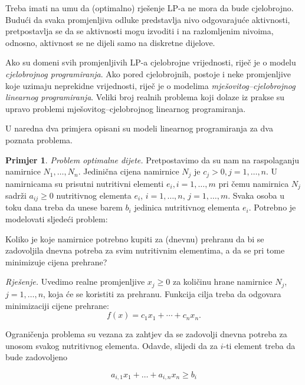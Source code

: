 \documentclass[a4paper, utf8, 11pt, colorlinks]{book}
\theoremstyle{definition}
\newtheorem{primjer}{Primjer}[chapter]
\begin{document}
Treba imati na umu da (optimalno) rješenje LP-a ne mora da bude cjelobrojno. Budući da svaka promjenljiva odluke predstavlja nivo odgovarajuće aktivnosti, pretpostavlja se da se aktivnosti mogu izvoditi i na razlomljenim nivoima, odnosno, aktivnost  se ne dijeli samo na diskretne dijelove. 

Ako su domeni svih promjenljivih LP-a cjelobrojne vrijednosti, riječ je o modelu \emph{cjelobrojnog programiranja}. Ako pored cjelobrojnih, postoje i neke promjenljive koje uzimaju neprekidne vrijednosti, riječ je o modelima \emph{mješovitog--cjelobrojnog linearnog programiranja}. Veliki broj realnih problema koji dolaze iz prakse su upravo problemi mješovitog--cjelobrojnog linearnog programiranja.
 


U naredna dva primjera opisani su modeli linearnog programiranja za dva poznata problema. 

\begin{primjer}
\emph{Problem optimalne dijete.} Pretpostavimo da su nam na raspolaganju namirnice $N_1, \ldots, N_n$. Jedinična cijena namirnice $N_j$ je $c_j>0, j = 1, \ldots, n$. U namirnicama su prisutni nutritivni elementi $e_i,i=1,\ldots,m$ pri čemu
namirnica $N_j$ sadrži $a_{ij} \geq 0$ nutritivnog elementa $e_i$, $i = 1, \ldots, n$, $j = 1, \ldots, m$. Svaka osoba u toku dana treba da unese barem $b_i$
jedinica nutritivnog elementa $e_i$. Potrebno je modelovati
sljedeći problem: 

Koliko je koje namirnice potrebno kupiti za (dnevnu) prehranu da bi se zadovoljila dnevna
potreba za svim nutritivnim elementima, a da se pri tome minimizuje cijena prehrane?
\end{primjer}
 
 \emph{Rješenje.}  Uvedimo realne promjenljive $x_j \geq 0$ za količinu hrane namirnice $N_j$, $j = 1, \ldots, n$, koja će se koristiti za prehranu. Funkcija cilja treba da odgovara minimizaciji cijene prehrane:
 $$f(x) = c_1 x_1 + \cdots + c_n x_n.$$
 
 Ograničenja problema su vezana za zahtjev da se zadovolji dnevna potreba za unosom svakog nutritivnog elementa. Odavde, slijedi da za $i$-ti element treba da bude zadovoljeno
 
 $$ a_{i,1} x_1 + \ldots + a_{i,n} x_n \geq b_i $$
 
\end{document}
